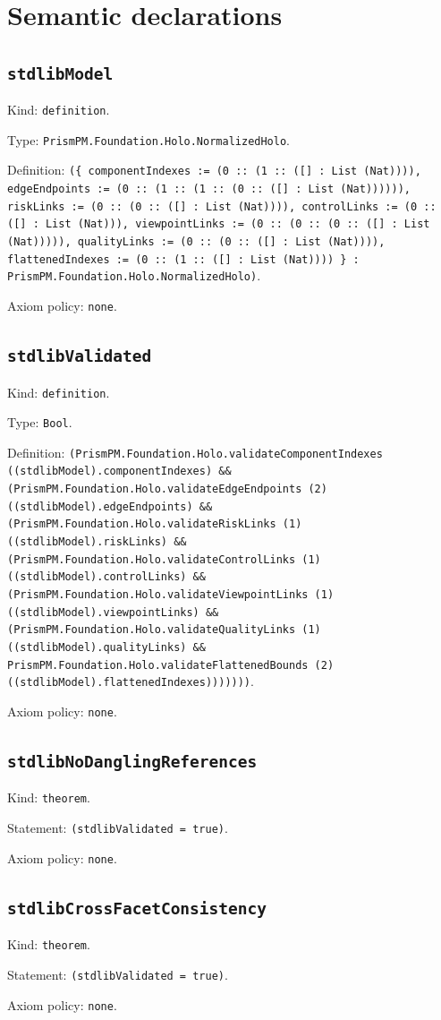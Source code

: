 \documentclass[11pt]{article}
\begin{document}
\section*{Semantic declarations}
\subsection*{\texttt{stdlibModel}}
\noindent Kind: \texttt{definition}.\par
\noindent Type: \texttt{PrismPM.Foundation.Holo.NormalizedHolo}.\par
\noindent Definition: \texttt{(\{ componentIndexes := (0 :: (1 :: ([] : List (Nat)))), edgeEndpoints := (0 :: (1 :: (1 :: (0 :: ([] : List (Nat)))))), riskLinks := (0 :: (0 :: ([] : List (Nat)))), controlLinks := (0 :: ([] : List (Nat))), viewpointLinks := (0 :: (0 :: (0 :: ([] : List (Nat))))), qualityLinks := (0 :: (0 :: ([] : List (Nat)))), flattenedIndexes := (0 :: (1 :: ([] : List (Nat)))) \} : PrismPM.Foundation.Holo.NormalizedHolo)}.\par
\noindent Axiom policy: \texttt{none}.\par
\subsection*{\texttt{stdlibValidated}}
\noindent Kind: \texttt{definition}.\par
\noindent Type: \texttt{Bool}.\par
\noindent Definition: \texttt{(PrismPM.Foundation.Holo.validateComponentIndexes ((stdlibModel).componentIndexes) \&\& (PrismPM.Foundation.Holo.validateEdgeEndpoints (2) ((stdlibModel).edgeEndpoints) \&\& (PrismPM.Foundation.Holo.validateRiskLinks (1) ((stdlibModel).riskLinks) \&\& (PrismPM.Foundation.Holo.validateControlLinks (1) ((stdlibModel).controlLinks) \&\& (PrismPM.Foundation.Holo.validateViewpointLinks (1) ((stdlibModel).viewpointLinks) \&\& (PrismPM.Foundation.Holo.validateQualityLinks (1) ((stdlibModel).qualityLinks) \&\& PrismPM.Foundation.Holo.validateFlattenedBounds (2) ((stdlibModel).flattenedIndexes)))))))}.\par
\noindent Axiom policy: \texttt{none}.\par
\subsection*{\texttt{stdlibNoDanglingReferences}}
\noindent Kind: \texttt{theorem}.\par
\noindent Statement: \texttt{(stdlibValidated = true)}.\par
\noindent Axiom policy: \texttt{none}.\par
\subsection*{\texttt{stdlibCrossFacetConsistency}}
\noindent Kind: \texttt{theorem}.\par
\noindent Statement: \texttt{(stdlibValidated = true)}.\par
\noindent Axiom policy: \texttt{none}.\par
\end{document}
